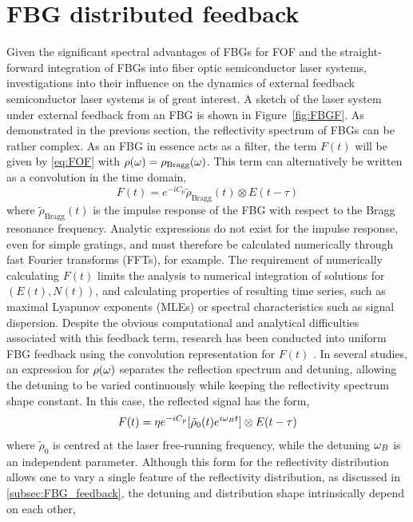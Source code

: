 \section*{FBG distributed feedback}
\label{sec:FBG_feedback}
%
Given the significant spectral advantages of FBGs for FOF and the straight-forward integration of FBGs into fiber optic semiconductor laser systems, 
investigations into their influence on the dynamics of external feedback semiconductor laser systems is of great interest. 
A sketch of the laser system under external feedback from an FBG is shown in Figure~\ref{fig:FBGF}. 
As demonstrated in the previous section, the reflectivity spectrum of FBGs can be rather complex. 
As an FBG in essence acts as a filter, the term $F(t)$ will be given by \eqref{eq:FOF} with $\rho(\omega) = \rho_\text{Bragg}(\omega)$. 
This term can alternatively be written as a convolution in the time domain,
%
\begin{equation}
    \label{eq:convolution}
     F(t) = e^{-i C_p} \tilde{\rho}_\text{Bragg}(t) \otimes E(t-\tau)
\end{equation}
%
where $\tilde{\rho}_\text{Bragg}(t)$ is the impulse response of the FBG with respect to the Bragg resonance frequency. 
Analytic expressions do not exist for the impulse response, even for simple gratings, and must therefore be calculated numerically through fast Fourier transforms (FFTs), for example. 
The requirement of numerically calculating $F(t)$ limits the analysis to numerical integration of solutions for $(E(t),N(t))$, and calculating properties of resulting time series, 
such as maximal Lyapunov exponents (MLEs) or spectral characteristics such as signal dispersion. 
Despite the obvious computational and analytical difficulties associated with this feedback term, 
research has been conducted into uniform FBG feedback using the convolution representation for $F(t)$ \cite{li2012distributed, li2015chaotic, li2020stable, jiang2021characterizing, skenderas2021feedback, skenderas2024impact}. 
In several studies, an expression for $\rho(\omega)$ separates the reflection spectrum and detuning, allowing the detuning to be varied continuously while keeping the reflectivity spectrum shape constant. 
In this case, the reflected signal has the form,
%
\begin{equation*}
    F(t) = \eta e^{-i C_p} [\tilde{\rho}_0(t) e^{i \omega_B t}] \otimes E(t-\tau)
\end{equation*}
%
where $\tilde{\rho}_0$ is centred at the laser free-running frequency, while the detuning $\omega_B$ is an independent parameter. 
Although this form for the reflectivity distribution allows one to vary a single feature of the reflectivity distribution, as discussed in \ref{subsec:FBG_feedback}, the detuning and distribution shape intrinsically depend on each other, 
